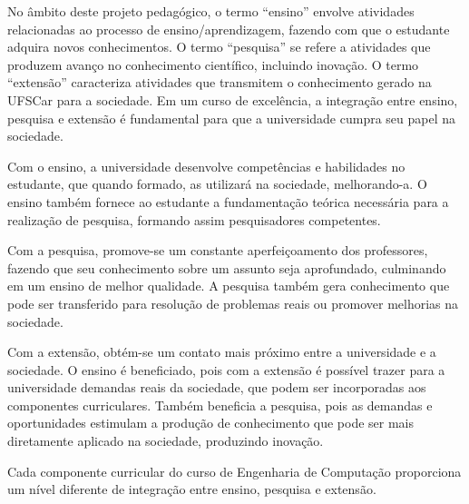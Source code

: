 No âmbito deste projeto pedagógico, o termo ``ensino'' envolve atividades relacionadas ao processo de ensino/aprendizagem, fazendo com que o estudante adquira novos conhecimentos. O termo ``pesquisa'' se refere a atividades que produzem avanço no conhecimento científico, incluindo inovação. O termo ``extensão'' caracteriza atividades que transmitem o conhecimento gerado na UFSCar para a sociedade. Em um curso de excelência, a integração entre ensino, pesquisa e extensão é fundamental para que a universidade cumpra seu papel na sociedade.

Com o ensino, a universidade desenvolve competências e habilidades no estudante, que quando formado, as utilizará na sociedade, melhorando-a. O ensino também fornece ao estudante a fundamentação teórica necessária para a realização de pesquisa, formando assim pesquisadores competentes.

Com a pesquisa, promove-se um constante aperfeiçoamento dos professores, fazendo que seu conhecimento sobre um assunto seja aprofundado, culminando em um ensino de melhor qualidade. A pesquisa também gera conhecimento que pode ser transferido para resolução de problemas reais ou promover melhorias na sociedade.

Com a extensão, obtém-se um contato mais próximo entre a universidade e a sociedade. O ensino é beneficiado, pois com a extensão é possível trazer para a universidade demandas reais da sociedade, que podem ser incorporadas aos componentes curriculares. Também beneficia a pesquisa, pois as demandas e oportunidades estimulam a produção de conhecimento que pode ser mais diretamente aplicado na sociedade, produzindo inovação.

Cada componente curricular do curso de Engenharia de Computação proporciona um nível diferente de integração entre ensino, pesquisa e extensão.



